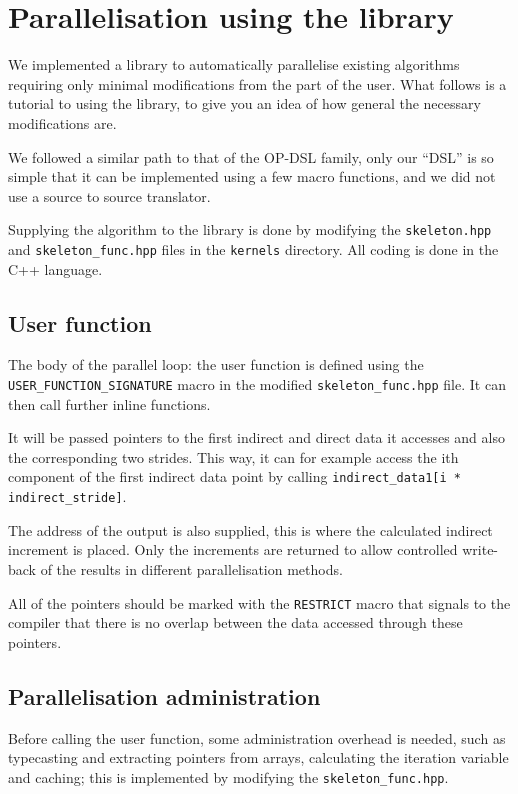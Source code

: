 \section{Parallelisation using the library}

We implemented a library to automatically parallelise existing algorithms
requiring only minimal modifications from the part of the user. What follows is
a tutorial to using the library, to give you an idea of how general the
necessary modifications are.

We followed a similar path to that of the OP-DSL family, only our ``DSL'' is so
simple that it can be implemented using a few macro functions, and we did not
use a source to source translator.

Supplying the algorithm to the library is done by modifying the
\texttt{skeleton.hpp} and \texttt{skeleton\_func.hpp} files in the
\texttt{kernels} directory. All coding is done in the C++ language.

\subsection{User function}

The body of the parallel loop: the user function is defined using the
\lstinline!USER_FUNCTION_SIGNATURE! macro in the modified
\texttt{skeleton\_func.hpp} file. It can then call further inline functions.

It will be passed pointers to the first indirect and direct data it accesses and
also the corresponding two strides. This way, it can for example access the ith
component of the first indirect data point by calling
\lstinline!indirect_data1[i * indirect_stride]!.

The address of the output is also supplied, this is where the calculated
indirect increment is placed. Only the increments are returned to allow
controlled write-back of the results in different parallelisation methods.

All of the pointers should be marked with the \lstinline!RESTRICT! macro that
signals to the compiler that there is no overlap between the data accessed
through these pointers.

\subsection{Parallelisation administration}

Before calling the user function, some administration overhead is needed, such
as typecasting and extracting pointers from arrays, calculating the iteration
variable and caching; this is implemented by modifying the
\texttt{skeleton\_func.hpp}.

